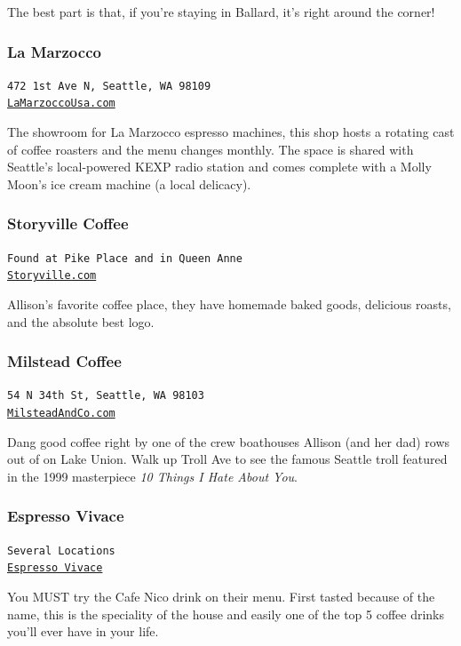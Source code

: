 \documentclass[12pt]{article}
\begin{document}
The best part is that, if you're staying in Ballard, it's right around the corner!

\subsubsection{La Marzocco}
\begin{center}
    \texttt{472 1st Ave N, Seattle, WA 98109 \\\href{https://lamarzoccousa.com}{LaMarzoccoUsa.com}}
\end{center}
The showroom for La Marzocco espresso machines, this shop hosts a rotating cast of coffee roasters and 
the menu changes monthly. The space is shared with Seattle's local-powered KEXP radio station and comes 
complete with a Molly Moon's ice cream machine (a local delicacy). 

\subsubsection{Storyville Coffee}
\begin{center}
    \texttt{Found at Pike Place and in Queen Anne\\\href{https://storyville.com/}{Storyville.com}}
\end{center}
Allison's favorite coffee place, they have homemade baked goods, delicious roasts, and the absolute best logo.

\subsubsection{Milstead Coffee}
\begin{center}
    \texttt{54 N 34th St, Seattle, WA 98103\\\href{http://milsteadandco.com/}{MilsteadAndCo.com}}
\end{center}
Dang good coffee right by one of the crew boathouses Allison (and her dad) rows out of on Lake Union. 
Walk up Troll Ave to see the famous Seattle troll featured in the 1999 masterpiece \textit{10 Things I Hate About You}.

\subsubsection{Espresso Vivace}
\begin{center}
    \texttt{Several Locations\\\href{http://espressovivace.com/}{Espresso Vivace}}
\end{center}
You MUST try the Cafe Nico drink on their menu. First tasted because of the name, this is the speciality of 
the house and easily one of the top 5 coffee drinks you’ll ever have in your life.
\end{document}
